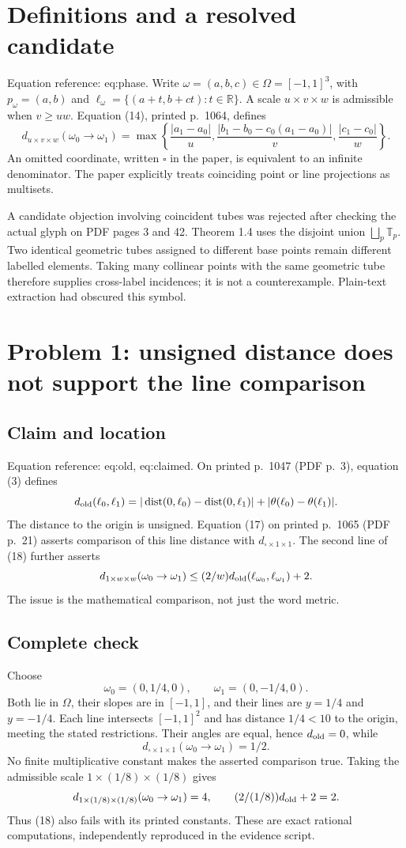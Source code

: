 \documentclass[10pt]{article}
\begin{document}
\section*{Definitions and a resolved candidate}
Equation reference: eq:phase. Write \(\omega=(a,b,c)\in\Omega=[-1,1]^3\), with \(p_\omega=(a,b)\) and \(\ell_\omega=\{(a+t,b+ct):t\in\mathbb R\}\). A scale \(u\times v\times w\) is admissible when \(v\geq uw\). Equation (14), printed p. 1064, defines \[
d_{u\times v\times w}(\omega_0\to\omega_1)
=\max\left\{\frac{|a_1-a_0|}{u},
\frac{|b_1-b_0-c_0(a_1-a_0)|}{v},
\frac{|c_1-c_0|}{w}\right\}.\] An omitted coordinate, written \(\square\) in the paper, is equivalent to an infinite denominator. The paper explicitly treats coinciding point or line projections as multisets.\par
A candidate objection involving coincident tubes was rejected after checking the actual glyph on PDF pages 3 and 42. Theorem 1.4 uses the disjoint union \(\bigsqcup_p\mathbb T_p\). Two identical geometric tubes assigned to different base points remain different labelled elements. Taking many collinear points with the same geometric tube therefore supplies cross-label incidences; it is not a counterexample. Plain-text extraction had obscured this symbol.\par
\section*{Problem 1: unsigned distance does not support the line comparison}
\subsection*{Claim and location}
Equation reference: eq:old, eq:claimed. On printed p. 1047 (PDF p. 3), equation (3) defines \[
d_{\rm old}(\ell_0,\ell_1)
=|\operatorname{dist}(0,\ell_0)-\operatorname{dist}(0,\ell_1)|
+|\theta(\ell_0)-\theta(\ell_1)|.\] The distance to the origin is unsigned. Equation (17) on printed p. 1065 (PDF p. 21) asserts comparison of this line distance with \(d_{\square\times1\times1}\). The second line of (18) further asserts \[
d_{1\times w\times w}(\omega_0\to\omega_1)
\leq (2/w)d_{\rm old}(\ell_{\omega_0},\ell_{\omega_1})+2.\] The issue is the mathematical comparison, not just the word metric.\par
\subsection*{Complete check}
Choose \[\omega_0=(0,1/4,0),\qquad \omega_1=(0,-1/4,0).\] Both lie in \(\Omega\), their slopes are in \([-1,1]\), and their lines are \(y=1/4\) and \(y=-1/4\). Each line intersects \([-1,1]^2\) and has distance \(1/4<10\) to the origin, meeting the stated restrictions. Their angles are equal, hence \(d_{\rm old}=0\), while \[d_{\square\times1\times1}(\omega_0\to\omega_1)=1/2.\] No finite multiplicative constant makes the asserted comparison true. Taking the admissible scale \(1\times(1/8)\times(1/8)\) gives \[d_{1\times(1/8)\times(1/8)}(\omega_0\to\omega_1)=4,
\qquad (2/(1/8))d_{\rm old}+2=2.\] Thus (18) also fails with its printed constants. These are exact rational computations, independently reproduced in the evidence script.\par
\end{document}
